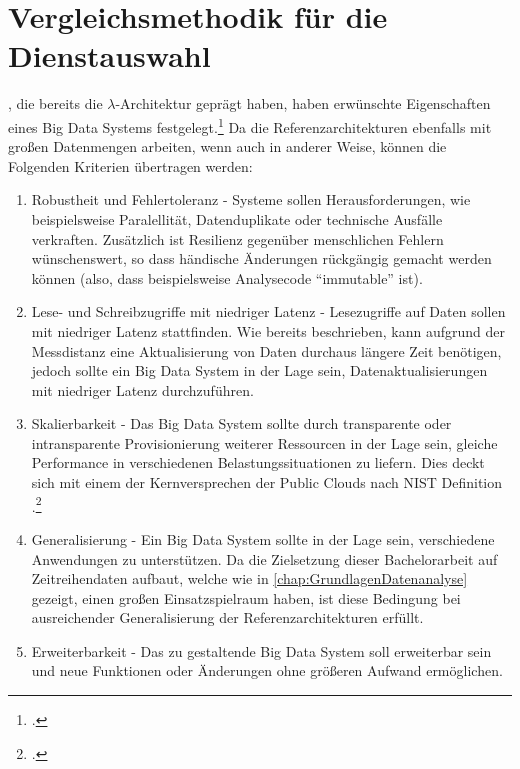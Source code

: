 \section{Vergleichsmethodik für die Dienstauswahl}\label{chap:vergleichsmethodik}

\citeauthor{Marz.2015}, die bereits die $\lambda$-Architektur geprägt haben, haben erwünschte Eigenschaften eines Big Data Systems festgelegt.\footcite[Vgl. auch im Folgenden][7\psqq]{Marz.2015} Da die Referenzarchitekturen ebenfalls mit großen Datenmengen arbeiten, wenn auch in anderer Weise, können die Folgenden Kriterien übertragen werden:
\begin{enumerate}
\item Robustheit und Fehlertoleranz  - 
Systeme sollen Herausforderungen, wie beispielsweise Paralellität, Datenduplikate oder technische Ausfälle verkraften. Zusätzlich ist Resilienz gegenüber menschlichen Fehlern wünschenswert, so dass händische Änderungen rückgängig gemacht werden können (also, dass beispielsweise Analysecode \enquote{immutable} ist).

\item Lese- und Schreibzugriffe mit niedriger Latenz  - 
Lesezugriffe auf Daten sollen mit niedriger Latenz stattfinden. Wie bereits beschrieben, kann aufgrund der Messdistanz eine Aktualisierung von Daten durchaus längere Zeit benötigen, jedoch sollte ein Big Data System in der Lage sein, Datenaktualisierungen mit niedriger Latenz durchzuführen.

\item Skalierbarkeit  - 
Das Big Data System sollte durch transparente oder intransparente Provisionierung weiterer Ressourcen in der Lage sein, gleiche Performance in verschiedenen Belastungssituationen zu liefern. Dies deckt sich mit einem der Kernversprechen der Public Clouds nach NIST Definition .\footcite[Vgl.][2]{Mell.2011}

\item Generalisierung  - 
Ein Big Data System sollte in der Lage sein, verschiedene Anwendungen zu unterstützen. Da die Zielsetzung dieser Bachelorarbeit auf Zeitreihendaten aufbaut, welche wie in \autoref{chap:GrundlagenDatenanalyse} gezeigt, einen großen Einsatzspielraum haben, ist diese Bedingung bei ausreichender Generalisierung der Referenzarchitekturen erfüllt.

\item Erweiterbarkeit  - 
Das zu gestaltende Big Data System soll erweiterbar sein und neue Funktionen oder Änderungen ohne größeren Aufwand ermöglichen.


\end{enumerate}
